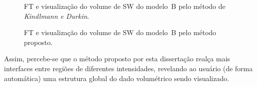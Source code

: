 \begin{figure}[h]
	\centering
	\caption{FT e visualização do volume de SW do modelo~B pelo método de \textit{Kindlmann e Durkin}.}
	\label{fig:r_box_sw_kd}
\end{figure}

\begin{figure}[h]
	\centering
	\caption{FT e visualização do volume de SW do modelo~B pelo método proposto.}
	\label{fig:r_box_sw_mine}
\end{figure}

	Assim, percebe-se que o método proposto por esta dissertação realça mais interfaces entre regiões de diferentes intensidades, revelando ao usuário (de forma automática) uma estrutura global do dado volumétrico sendo visualizado.

